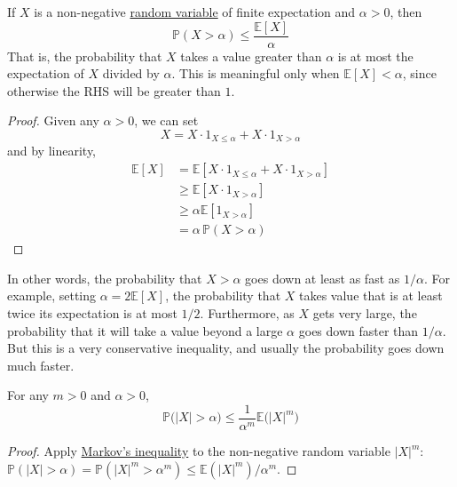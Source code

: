   \begin{theorem}
    \label{thm:markovs-inequality}
    If $X$ is a non-negative \hyperref[def:random-variable]{random variable} of finite expectation and $\alpha > 0$, then 
    \begin{equation}
      \mathbb{P}(X > \alpha) \leq \frac{\mathbb{E}[X]}{\alpha}
    \end{equation}
    That is, the probability that $X$ takes a value greater than $\alpha$ is at most the expectation of $X$ divided by $\alpha$. This is meaningful only when $\mathbb{E}[X] < \alpha$, since otherwise the RHS will be greater than $1$.  
  \end{theorem}
  \begin{proof}
    Given any $\alpha > 0$, we can set 
    \begin{equation}
      X = X \cdot 1_{X \leq \alpha} + X \cdot 1_{X > \alpha}
    \end{equation}
    and by linearity, 
    \begin{align*}
      \mathbb{E}[X] & = \mathbb{E}[X \cdot 1_{X \leq \alpha} + X \cdot 1_{X > \alpha}] \\
      & \geq \mathbb{E}[ X \cdot 1_{X > \alpha}] \\
      & \geq \alpha \mathbb{E}[1_{X > \alpha}] \\
      & = \alpha \, \mathbb{P}(X > \alpha) 
    \end{align*}
  \end{proof}

  In other words, the probability that $X > \alpha$ goes down at least as fast as $1/\alpha$. For example, setting $\alpha = 2 \mathbb{E}[X]$, the probability that $X$ takes value that is at least twice its expectation is at most $1/2$. Furthermore, as $X$ gets very large, the probability that it will take a value beyond a large $\alpha$ goes down faster than $1/\alpha$. But this is a very conservative inequality, and usually the probability goes down much faster. 

  \begin{corollary}
    \label{thm:markovs-inequality-for-higher-moments}
    For any $m > 0$ and $\alpha > 0$,  
    \begin{equation}
      \mathbb{P} \big(|X| > \alpha \big) \leq \frac{1}{\alpha^m} \mathbb{E} \big( |X|^m \big)
    \end{equation}
  \end{corollary}
  \begin{proof}
    Apply \hyperref[thm:markovs-inequality]{Markov's inequality} to the non-negative random variable $|X|^m$: $\mathbb{P}(|X| > \alpha) = \mathbb{P}(|X|^m > \alpha^m) \leq \mathbb{E}(|X|^m)/\alpha^m$. 
  \end{proof}

